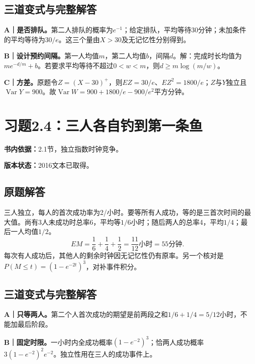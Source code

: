 \documentclass[
  11pt,
  a4paper,
  UTF8,fontset=fandol]{ctexart}
\let\OldSection\section
\renewcommand{\section}{\Needspace{7\baselineskip}\OldSection}
\let\OldSubsection\subsection
\renewcommand{\subsection}{\Needspace{5\baselineskip}\OldSubsection}
\begin{document}
\subsection{三道变式与完整解答}\label{ux4e09ux9053ux53d8ux5f0fux4e0eux5b8cux6574ux89e3ux7b54-2}

\textbf{A｜是否排队。}第二人排队的概率为\(e^{-1}\)；给定排队，平均等待30分钟；未加条件的平均等待为\(30/e\)。这三个量由\(X>30\)及无记忆性分别得到。

\textbf{B｜设计预约间隔。}第一人均值\(m\)，第二人均值\(b\)，间隔\(d\)。解：完成时长均值为\(m e^{-d/m}+b\)。若要求平均等待不超过\(0<w<m\)，则\(d\ge m\log(m/w)\)。

\textbf{C｜方差。}原题令\(Z=(X-30)^+\)，则\(EZ=30/e\)、\(EZ^2=1800/e\)；\(Z\)与\(Y\)独立且\(\operatorname{Var}Y=900\)。故\(\operatorname{Var}W=900+1800/e-900/e^2\)平方分钟。

\newpage

\section{习题2.4：三人各自钓到第一条鱼}\label{ux4e60ux98982.4ux4e09ux4ebaux5404ux81eaux9493ux5230ux7b2cux4e00ux6761ux9c7c}

\textbf{书内依据：}2.1节，独立指数时钟竞争。

\textbf{版本状态：}2016文本已取得。

\subsection{原题解答}\label{ux539fux9898ux89e3ux7b54-3}

三人独立，每人的首次成功率为2/小时。要等所有人成功，等的是三首次时间的最大值。尚有3人未成功时总率6，平均等\(1/6\)小时；随后两人的总率4，平均\(1/4\)；最后一人均值\(1/2\)。
\[\boxed{EM=\frac16+\frac14+\frac12=\frac{11}{12}\text{小时}=55\text{分钟}.}\]
每次有人成功后，其他人的剩余时钟因无记忆性仍有原率。另一个核对是\(P(M\le t)=(1-e^{-2t})^3\)，对补事件积分。

\subsection{三道变式与完整解答}\label{ux4e09ux9053ux53d8ux5f0fux4e0eux5b8cux6574ux89e3ux7b54-3}

\textbf{A｜只等两人。}第二个人首次成功的期望是前两段之和\(1/6+1/4=5/12\)小时，不能加最后阶段。

\textbf{B｜固定时限。}一小时内全成功概率\((1-e^{-2})^3\)；恰两人成功概率\(3(1-e^{-2})^2e^{-2}\)。独立性用在三人的成功事件上。
\end{document}
